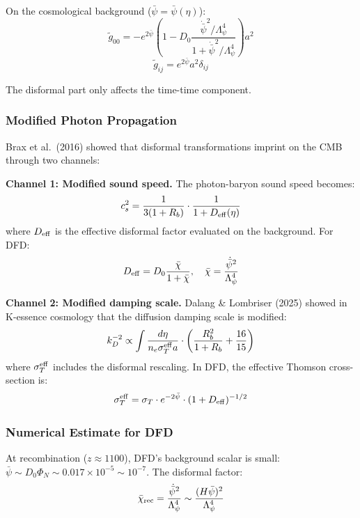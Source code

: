 \documentclass[11pt,a4paper]{article}
\begin{document}
On the cosmological background ($\bar{\psi} = \bar{\psi}(\eta)$):
\begin{equation}
\tilde{g}_{00} = -e^{2\bar{\psi}}\left(1 - D_0\frac{\dot{\bar{\psi}}^2/\Lambda_\psi^4}{1 + \dot{\bar{\psi}}^2/\Lambda_\psi^4}\right)a^2
\end{equation}
\begin{equation}
\tilde{g}_{ij} = e^{2\bar{\psi}}a^2\delta_{ij}
\end{equation}

The disformal part only affects the time-time component.

\subsubsection{Modified Photon Propagation}

Brax et al.\ (2016) showed that disformal transformations imprint on the CMB through two channels:

\textbf{Channel 1: Modified sound speed.} The photon-baryon sound speed becomes:
\begin{equation}
c_s^2 = \frac{1}{3(1+R_b)}\cdot\frac{1}{1 + D_{\rm eff}(\eta)}
\end{equation}
where $D_{\rm eff}$ is the effective disformal factor evaluated on the background. For DFD:
\begin{equation}
D_{\rm eff} = D_0\frac{\bar{\chi}}{1 + \bar{\chi}}, \quad \bar{\chi} = \frac{\dot{\bar{\psi}}^2}{\Lambda_\psi^4}
\end{equation}

\textbf{Channel 2: Modified damping scale.} Dalang \& Lombriser (2025) showed in K-essence cosmology that the diffusion damping scale is modified:
\begin{equation}
k_D^{-2} \propto \int \frac{d\eta}{n_e\sigma_T^{\rm eff}a} \cdot \left(\frac{R_b^2}{1+R_b} + \frac{16}{15}\right)
\end{equation}
where $\sigma_T^{\rm eff}$ includes the disformal rescaling. In DFD, the effective Thomson cross-section is:
\begin{equation}
\sigma_T^{\rm eff} = \sigma_T\cdot e^{-2\bar{\psi}}\cdot(1 + D_{\rm eff})^{-1/2}
\end{equation}

\subsubsection{Numerical Estimate for DFD}

At recombination ($z \approx 1100$), DFD's background scalar is small: $\bar{\psi} \sim D_0\Phi_N \sim 0.017 \times 10^{-5} \sim 10^{-7}$. The disformal factor:
\begin{equation}
\bar{\chi}_{\rm rec} = \frac{\dot{\bar{\psi}}^2}{\Lambda_\psi^4} \sim \frac{(H\bar{\psi})^2}{\Lambda_\psi^4}
\end{equation}
\end{document}
